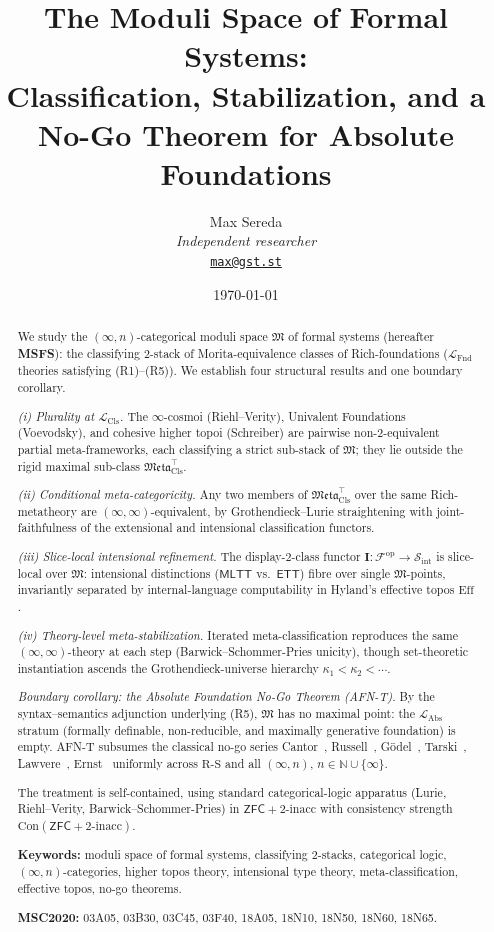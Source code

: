 \documentclass[11pt]{article}
\title{The Moduli Space of Formal Systems:\\
Classification, Stabilization, and a No-Go Theorem for Absolute Foundations}
\author{%
  \footnotesize Max Sereda \\[-3pt]
  \scriptsize\textit{Independent researcher} \\[-3pt]
  \scriptsize\texttt{\href{mailto:max@gst.st}{max@gst.st}}%
}
\date{\scriptsize\today}
\theoremstyle{plain}
\theoremstyle{definition}
\newcommand{\RS}{\mathrm{R\text{-}S}}
\newcommand{\cS}{\mathcal{S}}
\newcommand{\cF}{\mathcal{F}}
\newcommand{\fM}{\mathfrak{M}}
\newcommand{\Meta}{\mathfrak{Meta}}
\newcommand{\LFnd}{\mathcal{L}_{\mathrm{Fnd}}}
\newcommand{\LCls}{\mathcal{L}_{\mathrm{Cls}}}
\newcommand{\LAbs}{\mathcal{L}_{\mathrm{Abs}}}
\newcommand{\Sint}{\cS_{\mathrm{int}}}
\newcommand{\Con}{\mathrm{Con}}
\newcommand{\ZFC}{\mathsf{ZFC}}
\newcommand{\MLTT}{\mathsf{MLTT}}
\newcommand{\ETT}{\mathsf{ETT}}
\newcommand{\II}{\mathbf{I}}
\begin{document}
\maketitle

\begin{abstract}
We study the $(\infty, n)$-categorical moduli space $\fM$ of formal systems (hereafter \textbf{MSFS}): the classifying $2$-stack of Morita-equivalence classes of Rich-foundations ($\LFnd$ theories satisfying (R1)--(R5)). We establish four structural results and one boundary corollary.

\emph{(i) Plurality at $\LCls$.} The $\infty$-cosmoi (Riehl--Verity), Univalent Foundations (Voevodsky), and cohesive higher topoi (Schreiber) are pairwise non-$2$-equivalent partial meta-frameworks, each classifying a strict sub-stack of $\fM$; they lie outside the rigid maximal sub-class $\Meta_{\mathrm{Cls}}^{\top}$.

\emph{(ii) Conditional meta-categoricity.} Any two members of $\Meta_{\mathrm{Cls}}^{\top}$ over the same Rich-metatheory are $(\infty, \infty)$-equivalent, by Grothendieck--Lurie straightening with joint-faithfulness of the extensional and intensional classification functors.

\emph{(iii) Slice-local intensional refinement.} The display-$2$-class functor $\II : \cF^{\mathrm{op}} \to \Sint$ is slice-local over $\fM$: intensional distinctions ($\MLTT$ vs.\ $\ETT$) fibre over single $\fM$-points, invariantly separated by internal-language computability in Hyland's effective topos $\mathrm{Eff}$.

\emph{(iv) Theory-level meta-stabilization.} Iterated meta-classification reproduces the same $(\infty, \infty)$-theory at each step (Barwick--Schommer-Pries unicity), though set-theoretic instantiation ascends the Grothendieck-universe hierarchy $\kappa_1 < \kappa_2 < \cdots$.

\emph{Boundary corollary: the Absolute Foundation No-Go Theorem (AFN-T).} By the syntax--semantics adjunction underlying (R5), $\fM$ has no maximal point: the $\LAbs$ stratum (formally definable, non-reducible, and maximally generative foundation) is empty. AFN-T subsumes the classical no-go series Cantor~\cite{Cantor1891}, Russell~\cite{Russell1903}, G\"odel~\cite{Godel1931}, Tarski~\cite{Tarski1936}, Lawvere~\cite{Lawvere1969}, Ernst~\cite{Ernst2015} uniformly across $\RS$ and all $(\infty, n)$, $n \in \mathbb{N} \cup \{\infty\}$.

The treatment is self-contained, using standard categorical-logic apparatus (Lurie, Riehl--Verity, Barwick--Schommer-Pries) in $\ZFC + 2\text{-inacc}$ with consistency strength $\Con(\ZFC + 2\text{-inacc})$.

\smallskip
\noindent\textbf{Keywords:} moduli space of formal systems, classifying $2$-stacks, categorical logic, $(\infty, n)$-categories, higher topos theory, intensional type theory, meta-classification, effective topos, no-go theorems.

\smallskip
\noindent\textbf{MSC2020:} 03A05, 03B30, 03C45, 03F40, 18A05, 18N10, 18N50, 18N60, 18N65.

\end{abstract}
\end{document}
